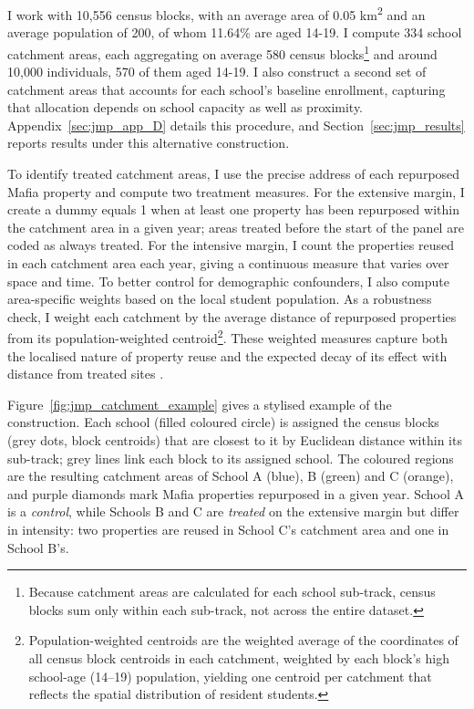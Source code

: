 \documentclass[12pt]{article}
\theoremstyle{plain}
\theoremstyle{plain}
\theoremstyle{plain}
\theoremstyle{definition}
\theoremstyle{plain}
\theoremstyle{definition}
\theoremstyle{plain}
\theoremstyle{remark}
\theoremstyle{definition}
\theoremstyle{definition}
\theoremstyle{plain}
\begin{document}
I work with 10,556 census blocks, with an average area of 0.05 km\textsuperscript{2} and an average population of 200, of whom 11.64\% are aged 14-19. I compute 334 school catchment areas, each aggregating on average 580 census blocks\footnote{Because catchment areas are calculated for each school sub-track, census blocks sum only within each sub-track, not across the entire dataset.} and around 10,000 individuals, 570 of them aged 14-19. I also construct a second set of catchment areas that accounts for each school's baseline enrollment, capturing that allocation depends on school capacity as well as proximity. Appendix~\ref{sec:jmp_app_D} details this procedure, and Section~\ref{sec:jmp_results} reports results under this alternative construction. \par
\medskip
To identify treated catchment areas, I use the precise address of each repurposed Mafia property and compute two treatment measures. For the extensive margin, I create a dummy equals 1 when at least one property has been repurposed within the catchment area in a given year; areas treated before the start of the panel are coded as always treated. For the intensive margin, I count the properties reused in each catchment area each year, giving a continuous measure that varies over space and time. To better control for demographic confounders, I also compute area-specific weights based on the local student population. As a robustness check, I weight each catchment by the average distance of repurposed properties from its population-weighted centroid\footnote{Population-weighted centroids are the weighted average of the coordinates of all census block centroids in each catchment, weighted by each block's high school-age (14--19) population, yielding one centroid per catchment that reflects the spatial distribution of resident students.}. These weighted measures capture both the localised nature of property reuse and the expected decay of its effect with distance from treated sites \citep{boeri_localized_2023, damm_does_2014}. \par
Figure~\ref{fig:jmp_catchment_example} gives a stylised example of the construction. Each school (filled coloured circle) is assigned the census blocks (grey dots, block centroids) that are closest to it by Euclidean distance within its sub-track; grey lines link each block to its assigned school. The coloured regions are the resulting catchment areas of School A (blue), B (green) and C (orange), and purple diamonds mark Mafia properties repurposed in a given year. School A is a \emph{control}, while Schools B and C are \emph{treated} on the extensive margin but differ in intensity: two properties are reused in School C's catchment area and one in School B's.
\end{document}
